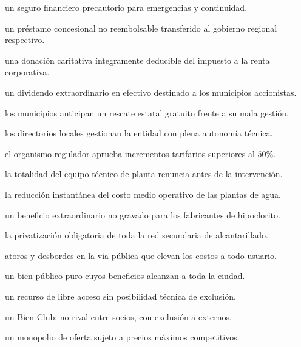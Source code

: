 \begin{opts}
    \item un seguro financiero precautorio para emergencias y continuidad.
    \item un préstamo concesional no reembolsable transferido al gobierno regional respectivo.
    \item una donación caritativa íntegramente deducible del impuesto a la renta corporativa.
    \item un dividendo extraordinario en efectivo destinado a los municipios accionistas.
\end{opts}

\begin{opts}
    \item los municipios anticipan un rescate estatal gratuito frente a su mala gestión.
    \item los directorios locales gestionan la entidad con plena autonomía técnica.
    \item el organismo regulador aprueba incrementos tarifarios superiores al $50\%$.
    \item la totalidad del equipo técnico de planta renuncia antes de la intervención.
\end{opts}

\begin{opts}
    \item la reducción instantánea del costo medio operativo de las plantas de agua.
    \item un beneficio extraordinario no gravado para los fabricantes de hipoclorito.
    \item la privatización obligatoria de toda la red secundaria de alcantarillado.
    \item atoros y desbordes en la vía pública que elevan los costos a todo usuario.
\end{opts}

\begin{opts}
    \item un bien público puro cuyos beneficios alcanzan a toda la ciudad.
    \item un recurso de libre acceso sin posibilidad técnica de exclusión.
    \item un Bien Club: no rival entre socios, con exclusión a externos.
    \item un monopolio de oferta sujeto a precios máximos competitivos.
\end{opts}

